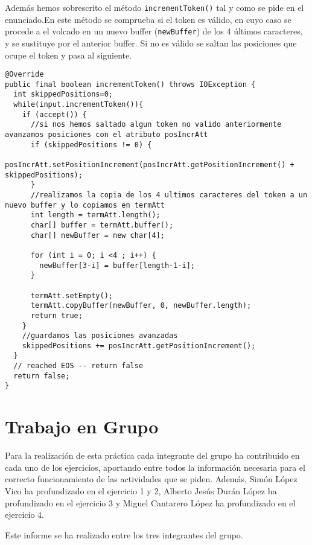 \begin{enumerate}
Además hemos sobrescrito el método \texttt{incrementToken()} tal y como se pide en el enunciado.En este método se comprueba si el token es válido, en cuyo caso se procede a el volcado en un nuevo buffer (\texttt{newBuffer}) de los 4 últimos caracteres, y se sustituye por el anterior buffer. Si no es válido se saltan las posiciones que ocupe el token y pasa al siguiente.

\begin{lstlisting}
@Override
public final boolean incrementToken() throws IOException {
  int skippedPositions=0;
  while(input.incrementToken()){
    if (accept()) {
      //si nos hemos saltado algun token no valido anteriormente avanzamos posiciones con el atributo posIncrAtt
      if (skippedPositions != 0) {
        posIncrAtt.setPositionIncrement(posIncrAtt.getPositionIncrement() + skippedPositions);
      }
      //realizamos la copia de los 4 ultimos caracteres del token a un nuevo buffer y lo copiamos en termAtt
      int length = termAtt.length();
      char[] buffer = termAtt.buffer();
      char[] newBuffer = new char[4];

      for (int i = 0; i <4 ; i++) {
        newBuffer[3-i] = buffer[length-1-i];
      }
      
      termAtt.setEmpty();
      termAtt.copyBuffer(newBuffer, 0, newBuffer.length);
      return true;
    }
    //guardamos las posiciones avanzadas
    skippedPositions += posIncrAtt.getPositionIncrement();
  }
  // reached EOS -- return false
  return false;
}
\end{lstlisting}

\end{enumerate}

\newpage

\section*{Trabajo en Grupo}
Para la realización de esta práctica cada integrante del grupo ha contribuido en cada uno de los ejercicios, aportando entre todos la información necesaria para el correcto funcionamiento de las actividades que se piden. Además, Simón López Vico ha profundizado en el ejercicio 1 y 2, Alberto Jesús Durán López ha profundizado en el ejercicio 3 y Miguel Cantarero López ha profundizado en el ejercicio 4.

Este informe se ha realizado entre los tres integrantes del grupo.




